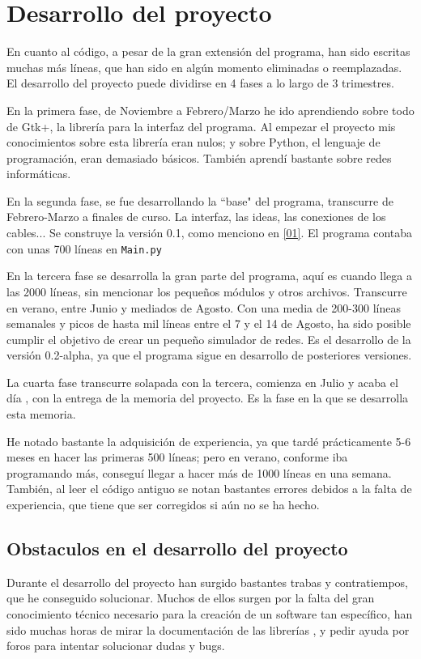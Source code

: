 \documentclass[a4paper, 11pt]{report} %
\begin{document}
\section{Desarrollo del proyecto}
En cuanto al código, a pesar de la gran extensión del programa, han sido escritas muchas más líneas, que han sido en algún momento eliminadas o reemplazadas. El desarrollo del proyecto puede dividirse en 4 fases a lo largo de 3 trimestres.

En la primera fase, de Noviembre a Febrero/Marzo he ido aprendiendo sobre todo de Gtk+, la librería para la interfaz del programa. Al empezar el proyecto mis conocimientos sobre esta librería eran nulos; y sobre Python, el lenguaje de programación, eran demasiado básicos. También aprendí bastante sobre redes informáticas.

En la segunda fase, se fue desarrollando la ``base" del programa, transcurre de Febrero-Marzo a finales de curso. La interfaz, las ideas, las conexiones de los cables... Se construye la versión 0.1, como menciono en \ref{01}. El programa contaba con unas 700 líneas en \texttt{Main.py}

En la tercera fase se desarrolla la gran parte del programa, aquí es cuando llega a las 2000 líneas, sin mencionar los pequeños módulos y otros archivos. Transcurre en verano, entre Junio y mediados de Agosto. Con una media de 200-300 líneas semanales y picos de hasta mil líneas entre el 7 y el 14 de Agosto, ha sido posible cumplir el objetivo de crear un pequeño simulador de redes. Es el desarrollo de la versión 0.2-alpha, ya que el programa sigue en desarrollo de posteriores versiones.

La cuarta fase transcurre solapada con la tercera, comienza en Julio y acaba el día \@date, con la entrega de la memoria del proyecto. Es la fase en la que se desarrolla esta memoria.

He notado bastante la adquisición de experiencia, ya que tardé prácticamente 5-6 meses en hacer las primeras 500 líneas; pero en verano, conforme iba programando más, conseguí llegar a hacer más de 1000 líneas en una semana. También, al leer el código antiguo se notan bastantes errores debidos a la falta de experiencia, que tiene que ser corregidos si aún no se ha hecho.

\subsection{Obstaculos en el desarrollo del proyecto}
Durante el desarrollo del proyecto han surgido bastantes trabas y contratiempos, que he conseguido solucionar. Muchos de ellos surgen por la falta del gran conocimiento técnico necesario para la creación de un software tan específico, han sido muchas horas de mirar la documentación de las librerías \cite{PyGiApi}, y pedir ayuda por foros para intentar solucionar dudas y bugs.
\end{document}
